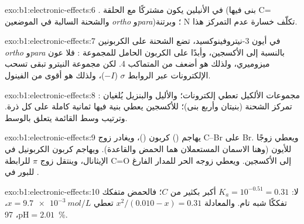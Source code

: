 \begin{solution}{exo:b1:electronic-effects:6}
. في الأنيلين يكون  مشتركًا مع الحلقة
(بنى فيها C= والشحنة السالبة في الموضعين \textit{ortho}
و\textit{para})؛ وبرتنة N تكلّف خسارة عدم التمركز هذا.
\end{solution}

\begin{solution}{exo:b1:electronic-effects:7}
في أيون 3-نيتروفينوكسيد، تضع  الشحنة على
الكربونين \textit{ortho} و\textit{para} بالنسبة إلى الأكسجين، وأبدًا على الكربون
الحامل للمجموعة : فلا عون ميزوميري، ولذلك هو أضعف من المتماكب 4. لكن
مجموعة النيترو تبقى تسحب الإلكترونات عبر الروابط $\sigma$ ($-I$)،
ولذلك هو أقوى من الفينول.
\end{solution}

\begin{solution}{exo:b1:electronic-effects:8}
: مجموعات الألكيل تعطي إلكترونات؛
والأليل والبنزيل يُلغيان تمركز الشحنة (بنيتان وأربع بنى)؛ 
للأكسجين يعطي بنية فيها ثمانية كاملة على كل ذرة. وترتيب
وسط القائمة يتعلق بالوسط.
\end{solution}

\begin{solution}{exo:b1:electronic-effects:9}
يهاجم  () كربون  ()،
ويغادر زوج C--Br على Br. ويعطي  زوجًا للأيون  (وهنا الاسمان
المستعملان هما الحمض والقاعدة). ويهاجم  كربون الكربونيل في
الإيثانال، وينتقل زوج $\pi$ للرابطة C=O إلى الأكسجين. ويعطي  زوجه الحر
للمدار الفارغ للبور في .
\end{solution}

\begin{solution}{exo:b1:electronic-effects:10}
لا: $K_a = 10^{-0.51} = 0.31$ أكبر بكثير من $C$؛ فالحمض متفكك
تفككًا شبه تام. والمعادلة $x^2/(0.010 - x) = 0.31$ تعطي $x = \qty{9.7e-3}{mol/L}$،
$\mathrm{pH} = 2.01$،  \qty{97}{\percent}.
\end{solution}

